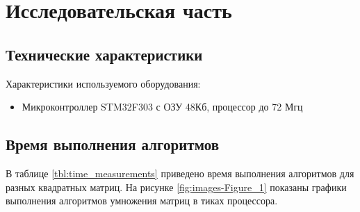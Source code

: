 \chapter{Исследовательская часть}

\section{Технические характеристики}

Характеристики используемого оборудования:
\begin{itemize}
    \item Микроконтроллер STM32F303 с ОЗУ 48Кб, процессор  до 72 Мгц \cite{bib1}
\end{itemize}

\section{Время выполнения алгоритмов}

В таблице \ref{tbl:time_measurements} приведено время выполнения алгоритмов для разных
квадратных матриц. На рисунке \ref{fig:images-Figure_1} показаны графики
выполнения алгоритмов умножения матриц в тиках процессора.


